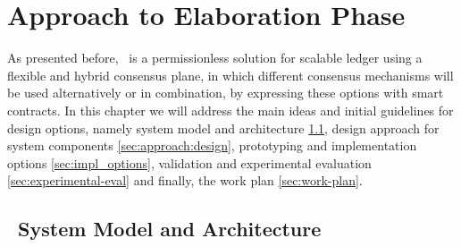 
%

\chapter{Approach to Elaboration Phase}
\label{cha:elaboration-approach}


As presented before, \mysystem~is a permissionless solution for scalable ledger using a flexible and hybrid consensus plane, in which different consensus mechanisms will be used alternatively or in combination, by expressing these options with smart contracts. In this chapter we will address the main ideas and initial guidelines for design options, namely system model and architecture \ref{sec:arch}, design approach for system components \ref{sec:approach:design}, prototyping and implementation options \ref{sec:impl_options}, validation and experimental evaluation \ref{sec:experimental-eval} and finally, the work plan \ref{sec:work-plan}.


\section{\mysystem~System Model and Architecture}
\label{sec:arch}

